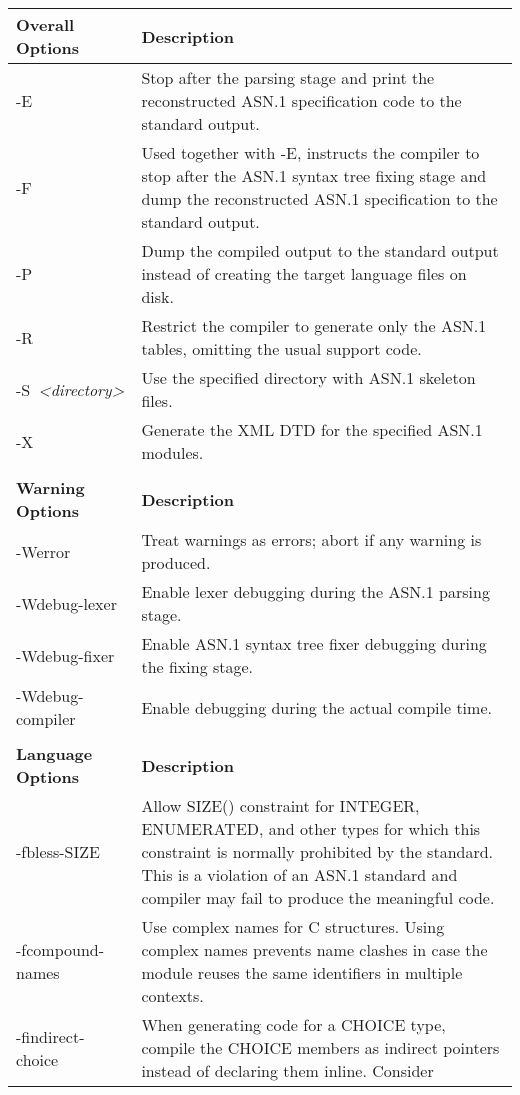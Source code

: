 \documentclass[english,oneside,12pt]{book}
\begin{document}
\renewcommand{\arraystretch}{1.33}
\begin{longtable}{lp{4in}}
\textbf{Overall Options} & \textbf{Description}\\
\midrule
{-E} & {\small Stop after the parsing stage and print the reconstructed ASN.1
specification code to the standard output.}\\
{-F} & {\small Used together with -E, instructs the compiler to stop after
the ASN.1 syntax tree fixing stage and dump the reconstructed ASN.1
specification to the standard output.}\\
{-P} & {\small Dump the compiled output to the standard output instead of
creating the target language files on disk.}\\
{-R} & {\small Restrict the compiler to generate only the ASN.1 tables, omitting the usual support code.}\\
{-S}~\emph{<directory>} & {\small Use the specified directory with ASN.1 skeleton files.}\\
{-X} & {\small Generate the XML DTD for the specified ASN.1 modules.}\\\\
\textbf{Warning Options} & \textbf{Description}\\
\midrule
{-Werror} & {\small Treat warnings as errors; abort if any warning is produced.}\\
{-Wdebug-lexer} & {\small Enable lexer debugging during the ASN.1 parsing stage.}\\
{-Wdebug-fixer} & {\small Enable ASN.1 syntax  tree  fixer  debugging  during  the
 fixing stage.}\\
{-Wdebug-compiler} & {\small Enable debugging during the actual compile time.}\\  \\
\textbf{Language Options} & \textbf{Description}\\
\midrule
{-fbless-SIZE} & {\small Allow SIZE() constraint for INTEGER, ENUMERATED, and other
types for which this constraint is normally prohibited by the standard.
This is a violation of an ASN.1 standard and compiler may fail to
produce the meaningful code.}\\
{-fcompound-names} & {\small Use complex names for C structures. Using complex names prevents
name clashes in case the module reuses the same identifiers in multiple
contexts.}\\
{-findirect-choice} & {\small When generating code for a CHOICE type, compile the CHOICE
members as indirect pointers instead of declaring them inline. Consider
}
\end{longtable}
\end{document}
